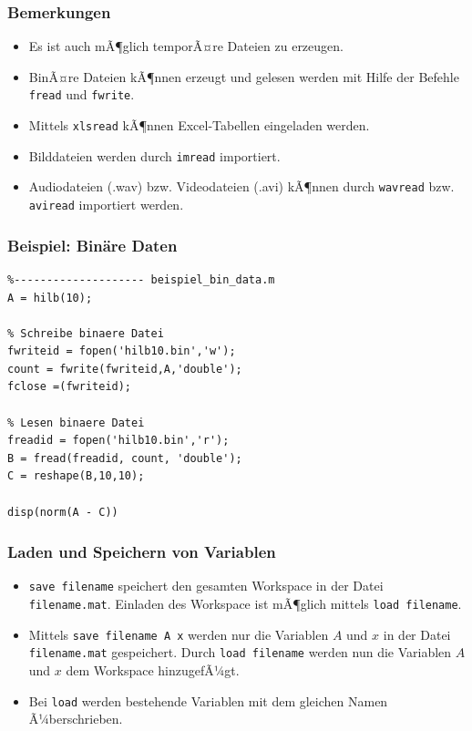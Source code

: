 %
%
\begin{frame}[fragile]\frametitle{Bemerkungen}
\begin{itemize}
\item Es ist auch mÃ¶glich temporÃ¤re Dateien zu erzeugen.
\item BinÃ¤re Dateien kÃ¶nnen erzeugt und gelesen werden mit Hilfe der
  Befehle \lstinline!fread! und \lstinline!fwrite!. 
\item  Mittels \lstinline!xlsread! kÃ¶nnen Excel-Tabellen eingeladen werden.
\item Bilddateien werden durch \lstinline!imread! importiert.
\item  Audiodateien (.wav) bzw. Videodateien (.avi) kÃ¶nnen durch
  \lstinline!wavread! bzw. \lstinline!aviread! importiert werden. 
\end{itemize}
\end{frame}
%
%
\begin{frame}[fragile]\frametitle{Beispiel: Bin\"are Daten}
\begin{lstlisting}
%-------------------- beispiel_bin_data.m
A = hilb(10);

% Schreibe binaere Datei
fwriteid = fopen('hilb10.bin','w');
count = fwrite(fwriteid,A,'double');
fclose =(fwriteid);

% Lesen binaere Datei
freadid = fopen('hilb10.bin','r');
B = fread(freadid, count, 'double');
C = reshape(B,10,10);

disp(norm(A - C))
\end{lstlisting}
\end{frame}
%
%
\begin{frame}[fragile]\frametitle{Laden und Speichern von \newline Variablen}
\begin{itemize}
\item \alert{ \lstinline!save filename!} speichert den gesamten
  Workspace in der Datei \lstinline!filename.mat!. Einladen des Workspace
  ist mÃ¶glich mittels  \alert{ \lstinline!load filename!}. 
\item Mittels \alert{ \lstinline!save filename A x!} werden nur die
  Variablen $A$ und $x$ in der Datei \lstinline!filename.mat!
  gespeichert. Durch  \alert{ \lstinline!load filename!} werden nun die
  Variablen $A$ und $x$ dem Workspace hinzugefÃ¼gt. 
\item Bei \lstinline!load! werden bestehende Variablen mit dem gleichen
  Namen Ã¼berschrieben.
\end{itemize}
\end{frame}

